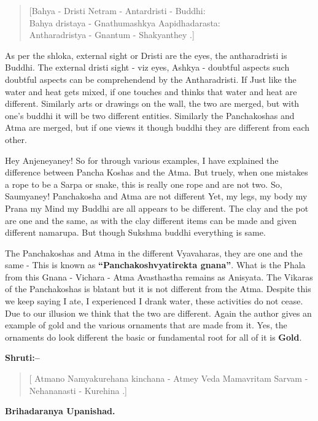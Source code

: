 \begin{verse}
 [Bahya - Dristi Netram - Antardristi - Buddhi:  \\
 Bahya dristaya - Gnathumashkya Aapidhadarasta:  \\
 Antharadristya - Gnantum - Shakyanthey .]
\end{verse}

As per the shloka, external sight or Dristi are the eyes, the antharadristi is Buddhi. The external dristi sight - viz eyes, Ashkya - doubtful aspects such doubtful aspects can be comprehendend by the Antharadristi. If Just like the water and heat gets mixed, if one touches and thinks that water and heat are different. Similarly arts or drawings on the wall, the two are merged, but with one's buddhi it will be two different entities. Similarly the Panchakoshas and Atma are merged, but if one views it though buddhi they are different from each other.

Hey Anjeneyaney! So for through various examples, I have explained the difference between Pancha Koshas and the Atma. But truely, when one mistakes a rope to be a Sarpa or snake, this is really one rope and are not two. So, Saumyaney! Panchakosha and Atma are not different Yet, my legs, my body my Prana my Mind my Buddhi are all appears to be different. The clay and the pot are one and the same, as with the clay different items can be made and given different namarupa. But though Sukshma buddhi everything is same.

The Panchakoshas and Atma in the different Vyavaharas, they are one and the same - This is known as \textbf{“Panchakoshvyatirekta gnana”}. What is the Phala from this Gnana - Vichara - Atma Avasthastha remains as Anisyata. The Vikaras of the Panchakoshas is blatant but it is not different from the Atma. Despite this we keep saying I ate, I experienced I drank water, these activities do not cease. Due to our illusion we think that the two are different. Again the author gives an example of gold and the various ornaments that are made from it. Yes, the ornaments do look different the basic or fundamental root for all of it is \textbf{Gold}.

\textbf{Shruti:–}

\begin{verse}
[ Atmano Namyakurehana kinchana - Atmey Veda Mamavritam Sarvam - Nehananasti - Kurehina .]
\end{verse}

\begin{flushright}
\textbf{Brihadaranya Upanishad.}
\end{flushright}

